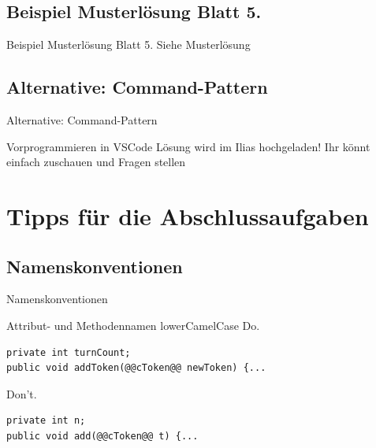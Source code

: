 \documentclass[aspectratio=169]{beamer}
\begin{document}
\subsection{Beispiel Musterlösung Blatt 5.}
\begin{frame}{Beispiel Musterlösung Blatt 5.}
  Siehe Musterlösung
\end{frame}

\subsection{Alternative: Command-Pattern}
\begin{frame}{Alternative: Command-Pattern}
  \begin{block}{Vorprogrammieren in VSCode}
    Lösung wird im Ilias hochgeladen! Ihr könnt einfach zuschauen und Fragen stellen
  \end{block}
\end{frame}

\section{Tipps für die Abschlussaufgaben}

\subsection{Namenskonventionen}
\begin{frame}[fragile]{Namenskonventionen}
  \begin{block}{Attribut- und Methodennamen}
    lowerCamelCase \linebreak
    \pause
    \color{nicegreen}Do.\color{FGround}
    \begin{lstlisting}[numbers=none]
private int turnCount;
public void addToken(@@cToken@@ newToken) {...
    \end{lstlisting}
    \pause
    \color{alertcolor}Don't.\color{FGround}
    \begin{lstlisting}[numbers=none]
private int n;
public void add(@@cToken@@ t) {...
    \end{lstlisting}
  \end{block}
\end{frame}
\end{document}

